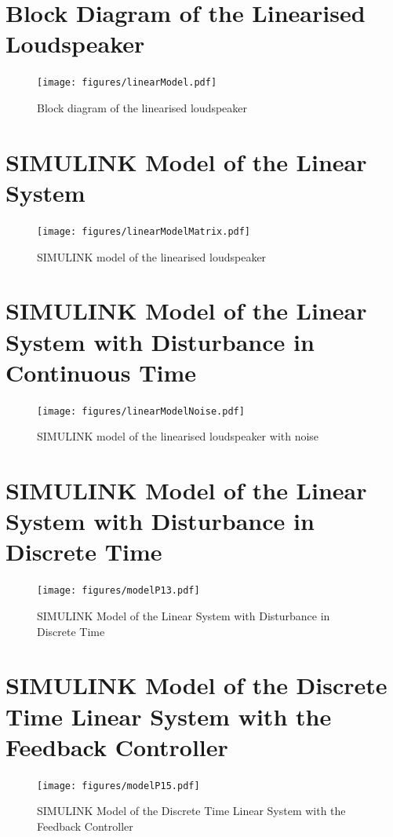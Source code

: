 \documentclass[12pt,a4paper,fleqn, onesside]{report}
\begin{document}
\chapter{Block Diagram of the Linearised Loudspeaker}
\label{AppLinearModelP7}
\begin{figure}[H]
 \centering 
 \texttt{[image: figures/linearModel.pdf]}
 \caption{Block diagram of the linearised loudspeaker}
\label{fig:linearModel}
\end{figure}


\chapter{SIMULINK Model of the Linear System}
\label{AppLinearModelP9}
\begin{figure}[H]
 \centering 
 \texttt{[image: figures/linearModelMatrix.pdf]}
 \caption{SIMULINK model of the linearised loudspeaker}
\label{fig:linearModelMatrix}
\end{figure}

\chapter{SIMULINK Model of the Linear System with Disturbance in Continuous Time}
\label{AppLinearModelNoiseP11}
\begin{figure}[H]
 \centering 
 \texttt{[image: figures/linearModelNoise.pdf]}
 \caption{SIMULINK model of the linearised loudspeaker with noise}
\label{fig:linearModelNoise}
\end{figure}

\chapter{SIMULINK Model of the Linear System with Disturbance in Discrete Time}
\label{AppDiscreteTimeP13}
\begin{figure}[H]
 \centering 
 \texttt{[image: figures/modelP13.pdf]}
 \caption{SIMULINK Model of the Linear System with Disturbance in Discrete Time}
\label{fig:modelP13}
\end{figure}

\chapter{SIMULINK Model of the Discrete Time Linear System with the Feedback Controller}
\label{AppDiscreteTimeP15}
\begin{figure}[H]
 \centering 
 \texttt{[image: figures/modelP15.pdf]}
 \caption{SIMULINK Model of the Discrete Time Linear System with the Feedback Controller}
\label{fig:modelP15}
\end{figure}
\end{document}
